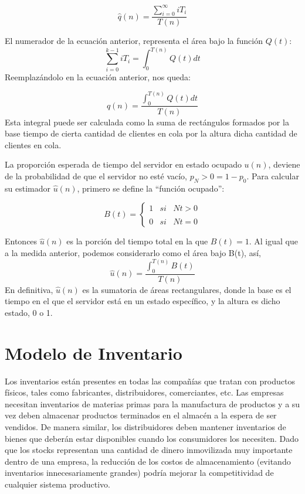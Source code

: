\begin{equation}
  \label{eq:equation4}
\hat{q}(n)=\frac{\sum_{i=0}^{\infty}iT_{i} }{T(n)}
\end{equation}

El numerador de la ecuación anterior, representa el área bajo la función $Q(t)$:
\begin{equation}
  \label{eq:equation5}
  \sum_{i=0}^{k-1}iT_{i} = \int_{0}^{T(n)}Q(t)dt
\end{equation}
Reemplazándolo en la ecuación anterior, nos queda:

\begin{equation}
  \label{eq:equation6}
  \hat{q}(n)=\frac{\int_{0}^{T(n)}Q(t)dt }{T(n)}
\end{equation}
Esta integral puede ser calculada como la suma de rectángulos formados por la base tiempo de cierta cantidad
de clientes en cola por la altura dicha cantidad de clientes en cola.

La proporción esperada de tiempo del servidor en estado ocupado $u(n)$, deviene de la probabilidad de que
el servidor no esté vacío, $p_{N} > 0 = 1 - p_{0}$. Para calcular su estimador $\hat{u}(n)$, primero se define la ``función
ocupado'':

\begin{equation}\label{eq:equation7}
  B(t) = \left\{ \begin{array}{lcc}
                  1 &   si  & Nt>0  \\
                  \\ 0 &  si  & Nt=0
  \end{array}
  \right.
\end{equation}

Entonces $\hat{u}(n)$ es la porción del tiempo total en la que $B(t) = 1$.
Al igual que a la medida anterior, podemos considerarlo como el área bajo B(t), así,
\begin{equation}\label{eq:equation8}
\hat{u}(n)=\frac{\int_{0}^{T(n)}B(t)}{T(n)}
\end{equation}
En definitiva, $\hat{u}(n)$ es la sumatoria de áreas rectangulares, donde la base es el tiempo en el que el servidor
está en un estado específico, y la altura es dicho estado, 0 o 1.

\section{Modelo de Inventario}\label{sec:modelo-m/m/c}
Los inventarios están presentes en todas las compañías que tratan con productos físicos,
tales como fabricantes, distribuidores, comerciantes, etc.
Las empresas necesitan inventarios de materias primas para la manufactura de productos y a su vez
deben almacenar productos terminados en el almacén a la espera de ser vendidos.
De manera similar, los distribuidores deben mantener inventarios de bienes que deberán estar
disponibles cuando los consumidores los necesiten.
Dado que los stocks representan una cantidad de dinero inmovilizada muy importante dentro
de una empresa, la reducción de los costos de almacenamiento (evitando inventarios
innecesariamente grandes) podría mejorar la competitividad de cualquier sistema
productivo.

